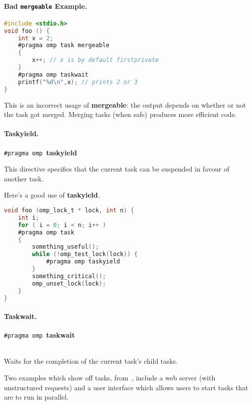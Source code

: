\paragraph{Bad {\tt mergeable} Example.}

  \begin{lstlisting}[language=C]
#include <stdio.h>
void foo () {
    int x = 2;
    #pragma omp task mergeable
    {
        x++; // x is by default firstprivate
    }
    #pragma omp taskwait
    printf("%d\n",x); // prints 2 or 3
}
  \end{lstlisting}
  
    This is an incorrect usage of {\bf mergeable}: the output depends
      on whether or not the task got merged.
    Merging tasks (when safe) produces more efficient code.

\paragraph{Taskyield.}

  \begin{center}
    {\tt \#pragma omp }{\bf taskyield}
  \end{center}

This directive specifies that the current task can be suspended in favour of another task.

  Here's a good use of {\bf taskyield}.

  \begin{lstlisting}[language=C]
void foo (omp_lock_t * lock, int n) {
    int i;
    for ( i = 0; i < n; i++ )
    #pragma omp task
    {
        something_useful();
        while (!omp_test_lock(lock)) {
            #pragma omp taskyield
        }
        something_critical();
        omp_unset_lock(lock);
    }
}
  \end{lstlisting}

\paragraph{Taskwait.}
  \begin{center}
    {\tt \#pragma omp }{\bf taskwait}
  \end{center}~\\[1em]

     Waits for the completion of the current task's child tasks.

Two examples which show off tasks,
from~\cite{Ayguade:2009:DOT:1512157.1512430}, include a web server (with
unstructured requests) and a user interface which allows users to
start tasks that are to run in parallel.


